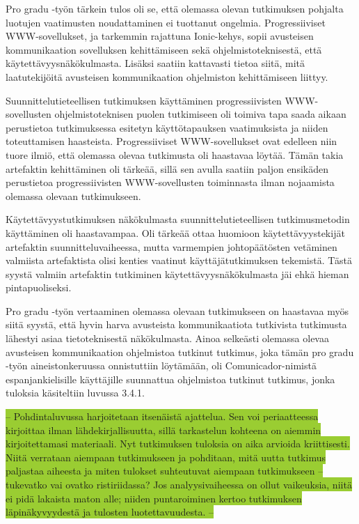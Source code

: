 \documentclass[utf8]{gradu3}
\begin{document}
Pro gradu -työn tärkein tulos oli se, että olemassa olevan tutkimuksen pohjalta luotujen vaatimusten noudattaminen ei tuottanut ongelmia. Progressiiviset WWW-sovellukset, ja tarkemmin rajattuna Ionic-kehys, sopii avusteisen kommunikaation sovelluksen kehittämiseen sekä ohjelmistoteknisestä, että käytettävyysnäkökulmasta. Lisäksi saatiin kattavasti tietoa siitä, mitä laatutekijöitä avusteisen kommunikaation ohjelmiston kehittämiseen liittyy.

Suunnittelutieteellisen tutkimuksen käyttäminen progressiivisten WWW-sovellusten ohjelmistoteknisen puolen tutkimiseen oli toimiva tapa saada aikaan perustietoa tutkimuksessa esitetyn käyttötapauksen vaatimuksista ja niiden toteuttamisen haasteista. Progressiiviset WWW-sovellukset ovat edelleen niin tuore ilmiö, että olemassa olevaa tutkimusta oli haastavaa löytää. Tämän takia artefaktin kehittäminen oli tärkeää, sillä sen avulla saatiin paljon ensikäden perustietoa progressiivisten WWW-sovellusten toiminnasta ilman nojaamista olemassa olevaan tutkimukseen.

Käytettävyystutkimuksen näkökulmasta suunnittelutieteellisen tutkimusmetodin käyttäminen oli haastavampaa. Oli tärkeää ottaa huomioon käytettävyystekijät artefaktin suunnitteluvaiheessa, mutta varmempien johtopäätösten vetäminen valmiista artefaktista olisi kenties vaatinut käyttäjätutkimuksen tekemistä. Tästä syystä valmiin artefaktin tutkiminen käytettävyysnäkökulmasta jäi ehkä hieman pintapuoliseksi.

Pro gradu -työn vertaaminen olemassa olevaan tutkimukseen on haastavaa myös siitä syystä, että hyvin harva avusteista kommunikaatiota tutkivista tutkimusta lähestyi asiaa tietoteknisestä näkökulmasta. Ainoa selkeästi olemassa olevaa avusteisen kommunikaation ohjelmistoa tutkinut tutkimus, joka tämän pro gradu -työn aineistonkeruussa onnistuttiin löytämään, oli Comunicador-nimistä espanjankielisille käyttäjille suunnattua ohjelmistoa tutkinut tutkimus, jonka tuloksia käsiteltiin luvussa 3.4.1.

\colorbox{YellowGreen}{-- Pohdintaluvussa harjoitetaan itsenäistä ajattelua. Sen voi periaatteessa kirjoittaa ilman lähdekirjallisuutta, sillä tarkastelun kohteena on aiemmin kirjoitettamasi materiaali. Nyt tutkimuksen tuloksia on aika arvioida kriittisesti. Niitä verrataan aiempaan tutkimukseen ja pohditaan, mitä uutta tutkimus paljastaa aiheesta ja miten tulokset suhteutuvat aiempaan tutkimukseen – tukevatko vai ovatko ristiriidassa? Jos analyysivaiheessa on ollut vaikeuksia, niitä ei pidä lakaista maton alle; niiden puntaroiminen kertoo tutkimuksen läpinäkyvyydestä ja tulosten luotettavuudesta. --}
\end{document}
